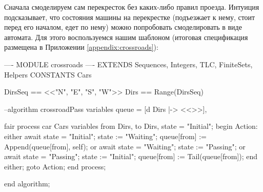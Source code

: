 \documentclass[14pt, openany]{report}
\newcounter{appendix}
\begin{document}
Сначала смоделируем сам перекресток без каких-либо правил проезда. Интуиция подсказывает, что состояния машины на перекрестке (подъезжает к нему, стоит перед его началом, едет по нему) можно попробовать смоделировать в виде автомата. Для этого воспользуемся нашим шаблоном (итоговая спецификация размещена в Приложении \ref{appendix:crossroads}):

\begin{tla}
---- MODULE crossroads ----
EXTENDS Sequences, Integers, TLC, FiniteSets, Helpers
CONSTANTS Cars

DirsSeq == <<"N", "E", "S", "W">>
Dirs == Range(DirsSeq)
\end{tla}
\begin{tlatex}
\@x{}\moduleLeftDash{}\moduleRightDash\@xx{}%
%
%
\@pvspace{8.0pt}%
%
\end{tlatex}
\begin{ppcal}
--algorithm crossroadPass
variables
  queue = [d \in Dirs |-> <<>>],

fair process car \in Cars
variables
  from \in Dirs, to \in Dirs, state = "Initial";
begin
  Action:
    either
      await state = "Initial";
      state := "Waiting";
      queue[from] := Append(queue[from], self);
    or
      await state = "Waiting";
      state := "Passing";
    or
      await state = "Passing";
      state := "Initial";
      queue[from] := Tail(queue[from]);
    end either;
    goto Action;
end process;

end algorithm;
\end{ppcal}
\begin{tlatex}
%
\@x{ {\p@variables}}%
\@pvspace{8.0pt}%
%
\@x{ {\p@variables}}%
\@x{ {\p@begin}}%
%
%
%
%
%
%
%
%
%
%
%
%
%
\@x{ {\p@end} {\p@process} {\p@semicolon}}%
\@pvspace{8.0pt}%
\@x{ {\p@end} {\p@algorithm} {\p@semicolon}}%
\end{tlatex}
\end{document}
